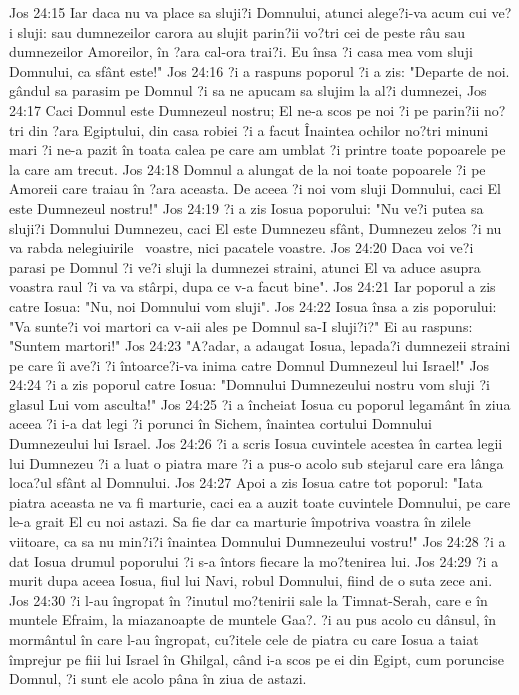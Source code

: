 Jos 24:15  Iar daca nu va place sa sluji?i Domnului, atunci alege?i-va acum cui ve?i sluji: sau dumnezeilor carora au slujit parin?ii vo?tri cei de peste râu sau dumnezeilor Amoreilor, în ?ara cal-ora trai?i. Eu însa ?i casa mea vom sluji Domnului, ca sfânt este!"
Jos 24:16  ?i a raspuns poporul ?i a zis: "Departe de noi. gândul sa parasim pe Domnul ?i sa ne apucam sa slujim la al?i dumnezei,
Jos 24:17  Caci Domnul este Dumnezeul nostru; El ne-a scos pe noi ?i pe parin?ii no?tri din ?ara Egiptului, din casa robiei ?i a facut Înaintea ochilor no?tri minuni mari ?i ne-a pazit în toata calea pe care am umblat ?i printre toate popoarele pe la care am trecut.
Jos 24:18  Domnul a alungat de la noi toate popoarele ?i pe Amoreii care traiau în ?ara aceasta. De aceea ?i noi vom sluji Domnului, caci El este Dumnezeul nostru!"
Jos 24:19  ?i a zis Iosua poporului: "Nu ve?i putea sa sluji?i Domnului Dumnezeu, caci El este Dumnezeu sfânt, Dumnezeu zelos ?i nu va rabda nelegiuirile  voastre, nici pacatele voastre.
Jos 24:20  Daca voi ve?i parasi pe Domnul ?i ve?i sluji la dumnezei straini, atunci El va aduce asupra voastra raul ?i va va stârpi, dupa ce v-a facut bine".
Jos 24:21  Iar poporul a zis catre Iosua: "Nu, noi Domnului vom sluji".
Jos 24:22  Iosua însa a zis poporului: "Va sunte?i voi martori ca v-aii ales pe Domnul sa-I sluji?i?" Ei au raspuns: "Suntem martori!"
Jos 24:23  "A?adar, a adaugat Iosua, lepada?i dumnezeii straini pe care îi ave?i ?i întoarce?i-va inima catre Domnul Dumnezeul lui Israel!"
Jos 24:24  ?i a zis poporul catre Iosua: "Domnului Dumnezeului nostru vom sluji ?i glasul Lui vom asculta!"
Jos 24:25  ?i a încheiat Iosua cu poporul legamânt în ziua aceea ?i i-a dat legi ?i porunci în Sichem, înaintea cortului Domnului Dumnezeului lui Israel.
Jos 24:26  ?i a scris Iosua cuvintele acestea în cartea legii lui Dumnezeu ?i a luat o piatra mare ?i a pus-o acolo sub stejarul care era lânga loca?ul sfânt al Domnului.
Jos 24:27  Apoi a zis Iosua catre tot poporul: "Iata piatra aceasta ne va fi marturie, caci ea a auzit toate cuvintele Domnului, pe care le-a grait El cu noi astazi. Sa fie dar ca marturie împotriva voastra în zilele viitoare, ca sa nu min?i?i înaintea Domnului Dumnezeului vostru!"
Jos 24:28  ?i a dat Iosua drumul poporului ?i s-a întors fiecare la mo?tenirea lui.
Jos 24:29  ?i a murit dupa aceea Iosua, fiul lui Navi, robul Domnului, fiind de o suta zece ani.
Jos 24:30  ?i l-au îngropat în ?inutul mo?tenirii sale la Timnat-Serah, care e în muntele Efraim, la miazanoapte de muntele Gaa?. ?i au pus acolo cu dânsul, în mormântul în care l-au îngropat, cu?itele cele de piatra cu care Iosua a taiat împrejur pe fiii lui Israel în Ghilgal, când i-a scos pe ei din Egipt, cum poruncise Domnul, ?i sunt ele acolo pâna în ziua de astazi.
